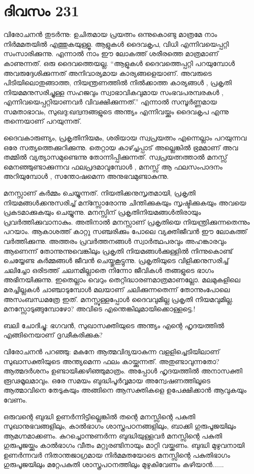 \section{ദിവസം 231}


വിരോചനന്‍ തുടര്‍ന്നു: ഉചിതമായ പ്രയത്നം ഒന്നുകൊണ്ടു മാത്രമേ നാം നിര്‍മമതയില്‍ എത്തുകയുള്ളൂ. ആളുകള്‍ ദൈവകൃപ, വിധി എന്നിവയെപ്പറ്റി സംസാരിക്കുന്നു. എന്നാല്‍ നാം ഈ ലോകത്ത് ശരീരത്തെ മാത്രമാണ് കാണുന്നത്. ഒരു ദൈവത്തെയല്ല. “ആളുകള്‍ ദൈവത്തെപ്പറ്റി പറയുമ്പോള്‍ അവരുദ്ദേശിക്കുന്നത് അനിവാര്യമായ കാര്യങ്ങളെയാണ്. അവരുടെ പിടിയിലൊതുങ്ങാത്ത, നിയന്ത്രണത്തില്‍ നില്‍ക്കാത്ത കാര്യങ്ങള്‍ , പ്രകൃതി നിയമമനുസരിച്ചുള്ള സഹജവും സ്വാഭാവികവുമായ സംഭവപരമ്പരകള്‍ , എന്നിവയെപ്പറ്റിയാണവര്‍ വിവക്ഷിക്കുന്നത്.”  എന്നാല്‍ സമ്പൂര്‍ണ്ണമായ സമതാഭാവം, സുഖദു:ഖദ്വന്ദങ്ങളുടെ അന്ത്യം എന്നിവയ്ക്കും ദൈവകൃപ എന്നു തന്നെയാണ് പറയുന്നത്. 

ദൈവകാരുണ്യം, പ്രകൃതിനിയമം, ശരിയായ സ്വപ്രയത്നം എന്നെല്ലാം പറയുന്നവ ഒരേ സത്യത്തെക്കുറിക്കുന്നു. തെറ്റായ കാഴ്ച്ചപ്പാട് അല്ലെങ്കില്‍ ഭ്രമമാണ് അവ തമ്മില്‍ വ്യത്യാസമുണ്ടെന്നു തോന്നിപ്പിക്കുന്നത്. സ്വപ്രയത്നത്താല്‍ മനസ്സ് മെനഞ്ഞുണ്ടാക്കുന്നവ ഫലപ്രദമാവുമ്പോള്‍ , മനസ്സ് ആ ഫലസംപാദനം അറിയുമ്പോള്‍ , സന്തോഷമെന്ന അനുഭവമുണ്ടാകുന്നു.

മനസ്സാണ് കര്‍മ്മം ചെയ്യുന്നത്. നിയതിക്കനുസൃതമായി, പ്രകൃതി നിയമങ്ങള്‍ക്കനുസരിച്ച് മന്സ്സോരോന്നു ചിന്തിക്കുകയും സൃഷ്ടിക്കുകയും അവയെ പ്രകടമാക്കുകയും ചെയ്യുന്നു. മനസ്സിന് പ്രകൃതിനിയമങ്ങള്‍തിരായും പ്രവര്‍ത്തിക്കുവാനാകും. അതിനാല്‍ മനസ്സാണ് പ്രകൃതിയെ നിയന്ത്രിക്കുന്നതെന്നും പറയാം. ആകാശത്ത് കാറ്റു സഞ്ചരിക്കും പോലെ വ്യക്തിജീവന്‍ ഈ ലോകത്ത് വര്‍ത്തിക്കുന്നു. അത്തരം പ്രവര്‍ത്തനങ്ങള്‍ സ്വാര്‍ത്ഥപരവും അഹങ്കാരവും ആണെന്ന് തോന്നുന്നുവെങ്കിലും പ്രകൃതി നിയമങ്ങള്‍ക്കുള്ളില്‍ നിന്നുകൊണ്ട് ചെയ്യേണ്ട കര്‍മ്മങ്ങള്‍ ജീവന്‍ ചെയ്തുകൂട്ടുന്നു. പ്രകൃതിയുടെ വിളിക്കനുസരിച്ച് ചലിച്ചോ ഒരിടത്ത് ചലനമില്ലാതെ നിന്നോ ജീവികള്‍ തങ്ങളുടെ ഭാഗം അഭിനയിക്കുന്നു. ഇതെല്ലാം വെറും തെറ്റിദ്ധാരണമാത്രമാണല്ലോ. മലമുകളിലെ മരച്ചില്ലകള്‍ ചാഞ്ചാടുമ്പോള്‍ മലയാണ് ചലിക്കുന്നതെന്ന് തോന്നുംപോലെ അസംബന്ധമത്രേ ഇത്. മനസ്സുള്ളപ്പോള്‍ ദൈവവുമില്ല പ്രകൃതി നിയമവുമില്ല. മനസ്സോടുങ്ങുമ്പോഴോ? അവിടെ എന്തെങ്കിലുമായിക്കൊള്ളട്ടെ.! 


ബലി ചോദിച്ചു: ഭഗവന്‍, സുഖാസക്തിയുടെ അന്ത്യം എന്റെ ഹൃദയത്തില്‍ എങ്ങിനെയാണ് ദൃഢീകരിക്കുക?

വിരോചനന്‍ പറഞ്ഞു: മകനേ ആത്മവിദ്യയാകുന്ന വളളിച്ചെടിയിലാണ് സുഖാസക്തിയുടെ അന്ത്യമെന്ന ഫലം കായ്ക്കുന്നത്. അതുണ്ടാവുന്നതോ? ആത്മദര്‍ശനം ഉണ്ടായിക്കഴിഞ്ഞുമാത്രം. അപ്പോള്‍ ഹൃദയത്തില്‍ അനാസക്തി രൂഢമൂലമാവും. ഒരേ സമയം ബുദ്ധിപൂര്‍വ്വമായ അന്വേഷണത്തിലൂടെ ആത്മാവിനെ തേടുകയും അങ്ങിനെ ആസക്തികളെ ഉപേക്ഷിക്കാന്‍ ആവുകയും വേണം.

ഒരുവന്റെ ബുദ്ധി ഉണര്‍ന്നിട്ടില്ലെങ്കില്‍ തന്റെ മനസ്സിന്റെ  പകുതി സുഖാനുഭവങ്ങളിലും, കാല്‍ഭാഗം ശാസ്ത്രപഠനങ്ങളിലും, ബാക്കി ഗുരുപൂജയിലും ആമഗ്നമാക്കണം. കുറച്ചൊന്നുണര്‍ന്ന ബുദ്ധിയുള്ളവര്‍ മനസ്സിന്റെ പകുതി ഗുരുപൂജയ്ക്കും കാല്‍ഭാഗം വീതം മറ്റുരണ്ടിനായും മാറ്റി വയ്ക്കണം. ബുദ്ധി മുഴുവനായി ഉണര്‍ന്നവര്‍  നിതാന്തജാഗ്രമായ നിര്‍മമതയോടെ മനസ്സിന്റെ പകുതിഭാഗം ഗുരുപൂജയിലും മറ്റേപകുതി ശാസ്ത്രപഠനത്തിലും മുഴുകിവേണം കഴിയാന്‍......
